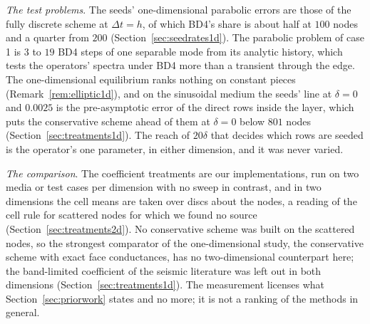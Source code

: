 \documentclass[11pt]{amsart}
\theoremstyle{definition}
\theoremstyle{remark}
\newcommand{\para}[1]{\par\smallskip\noindent\textit{#1}.\enspace}
\begin{document}
\para{The test problems}
The seeds' one-dimensional parabolic errors are those of the fully discrete
scheme at $\Delta t = h$, of which BD4's share is about half at $100$ nodes
and a quarter from $200$ (Section~\ref{sec:seedrates1d}). The parabolic
problem of case 1 is $3$ to $19$ BD4 steps of one separable mode from its
analytic history, which tests the operators' spectra under BD4 more than a
transient through the edge. The one-dimensional equilibrium ranks nothing on constant
pieces (Remark~\ref{rem:elliptic1d}), and on the sinusoidal medium the
seeds' line at $\delta = 0$ and $0.0025$ is the pre-asymptotic error of the
direct rows inside the layer, which puts the conservative scheme ahead of
them at $\delta = 0$ below $801$ nodes (Section~\ref{sec:treatments1d}). The reach of
$20\delta$ that decides which rows are seeded is the operator's one
parameter, in either dimension, and it was never varied.

\para{The comparison}
The coefficient treatments are our implementations, run on two media or
test cases per dimension with no sweep in contrast, and in two dimensions
the cell means
are taken over discs about the nodes, a reading of the cell rule for
scattered nodes for which we found no source
(Section~\ref{sec:treatments2d}). No conservative scheme was built on the
scattered nodes, so the strongest comparator of the one-dimensional study,
the conservative scheme with exact face conductances, has no
two-dimensional counterpart here; the band-limited coefficient of the
seismic literature was left out in both dimensions
(Section~\ref{sec:treatments1d}).
The measurement licenses what Section~\ref{sec:priorwork} states and no
more; it is not a ranking of the methods in general.
\end{document}
